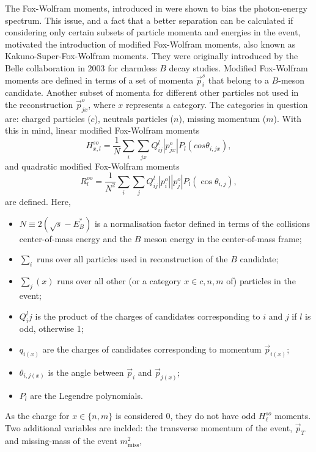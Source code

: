 The Fox-Wolfram moments, introduced in  were shown to bias the photon-energy spectrum.
This issue, and a fact that a better separation can be calculated if considering only certain subsets of particle momenta and energies in the event,
motivated the introduction of modified Fox-Wolfram moments, also known as Kakuno-Super-Fox-Wolfram moments.
They were originally introduced by the Belle collaboration in 2003 \cite{Belle:2003fgr} for charmless $B$ decay studies.
Modified Fox-Wolfram moments are defined in terms of a set of momenta $\vec{p}^{s}_i$ that belong to a $B$-meson candidate.
Another subset of momenta for different other particles not used in the reconstruction $\vec{p}^{o}_{jx}$, where $x$ represents a category.
The categories in question are: charged particles ($c$), neutrals particles ($n$), missing momentum ($m$).
With this in mind, linear modified Fox-Wolfram moments 
\begin{equation}
    H_{x,l}^{so} = \frac{1}{N} \sum_i \sum_{jx} Q^{l}_{ij}|p^o_{jx}|P_l(cos\theta_{i,jx}),
\end{equation}
and quadratic modified Fox-Wolfram moments
\begin{equation}
    R_{l}^{oo} = \frac{1}{N^2} \sum_i \sum_j Q^{l}_{ij} |p^o_i||p^o_j|P_l(\cos\theta_{i,j}),
\end{equation}
are defined.
Here, 
\begin{itemize}
\item $N\equiv 2(\sqrt{s}-E^{*}_B)$ is a normalisation factor defined in terms of the collisions center-of-mass energy and the $B$ meson energy in the center-of-mass frame;
\item $\sum_i$ runs over all particles used in reconstruction of the $B$ candidate;
\item $\sum_j(x)$ runs over all other (or a category $x\in{c,n,m}$ of) particles in the event;
\item $Q^{l}_ij$ is the product of the charges of candidates corresponding to $i$ and $j$ if $l$ is odd, otherwise 1;
\item $q_{i(x)}$ are the charges of candidates corresponding to momentum $\vec{p}_{i(x)}$;
\item $\theta_{i,j(x)}$ is the angle between $\vec{p}_i$ and $\vec{p}_{j(x)}$;
\item $P_l$ are the Legendre polynomials.
\end{itemize}
As the charge for $x\in\{n,m\}$ is considered 0, they do not have odd $H^{so}_{\ell}$ moments.
Two additional variables are inclded: the transverse momentum of the event, $\vec{p}_{T}$ and missing-mass of the event $m_{\mathrm{miss}}^2$,
